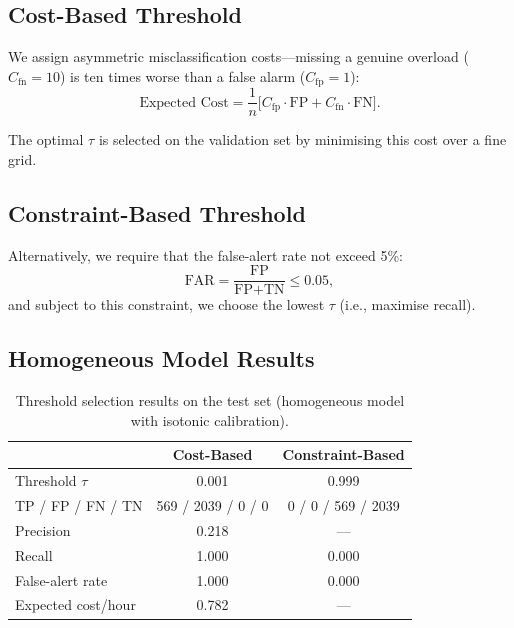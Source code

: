 \documentclass[12pt]{article}
\begin{document}
\subsection{Cost-Based Threshold}

We assign asymmetric misclassification costs---missing a genuine
overload ($C_{\mathrm{fn}} = 10$) is ten times worse than a false
alarm ($C_{\mathrm{fp}} = 1$):
\begin{equation}
\text{Expected Cost}
= \frac{1}{n}\bigl[C_{\mathrm{fp}} \cdot \text{FP}
  + C_{\mathrm{fn}} \cdot \text{FN}\bigr].
\end{equation}

The optimal $\tau$ is selected on the validation set by minimising this
cost over a fine grid.

\subsection{Constraint-Based Threshold}

Alternatively, we require that the false-alert rate not exceed 5\%:
\begin{equation}
\text{FAR} = \frac{\text{FP}}{\text{FP} + \text{TN}} \le 0.05,
\end{equation}
and subject to this constraint, we choose the lowest $\tau$ (i.e.,
maximise recall).

\subsection{Homogeneous Model Results}

\begin{table}[H]
\centering
\caption{Threshold selection results on the test set
  (homogeneous model with isotonic calibration).}
\label{tab:threshold_homo}
\begin{tabular}{lcc}
\toprule
& \textbf{Cost-Based} & \textbf{Constraint-Based} \\
\midrule
Threshold $\tau$ & 0.001 & 0.999 \\
TP / FP / FN / TN & 569 / 2039 / 0 / 0 & 0 / 0 / 569 / 2039 \\
Precision & 0.218 & --- \\
Recall & 1.000 & 0.000 \\
False-alert rate & 1.000 & 0.000 \\
Expected cost/hour & 0.782 & --- \\
\bottomrule
\end{tabular}
\end{table}
\end{document}
